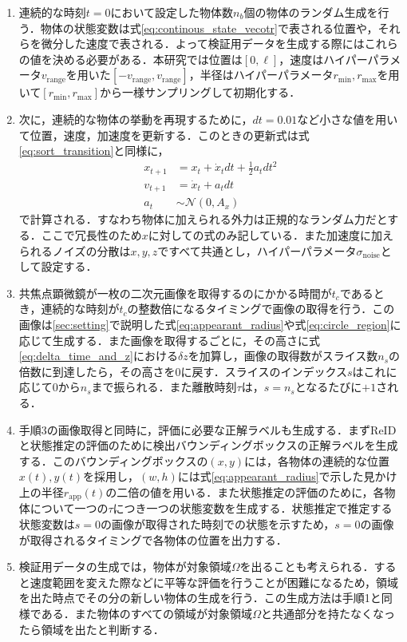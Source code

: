 \begin{enumerate}[label=手順\arabic*]
    \item 連続的な時刻$t=0$において設定した物体数$n_b$個の物体のランダム生成を行う．物体の状態変数は式\ref{eq:continous_state_vecotr}で表される位置や，それらを微分した速度で表される．よって検証用データを生成する際にはこれらの値を決める必要がある．本研究では位置は$[0, \ell]$，速度はハイパーパラメータ$v_{\text{range}}$を用いた$[-v_{\text{range}}, v_{\text{range}}]$，半径はハイパーパラメータ$r_{\text{min}}, r_{\text{max}}$を用いて$[r_{\text{min}}, r_{\text{max}}]$から一様サンプリングして初期化する．
    \item 次に，連続的な物体の挙動を再現するために，$dt=0.01$など小さな値を用いて位置，速度，加速度を更新する．このときの更新式は式\ref{eq:sort_transition}と同様に，
    \begin{equation}
        \label{eq:transition}
        \begin{aligned}
            x_{t+1} &= x_t + \dot{x}_t dt + \frac{1}{2} a_t dt^2
            \\v_{t+1} &= \dot{x}_t + a_t dt
            \\a_t &\sim \mathcal{N}(0, A_x)
        \end{aligned}
    \end{equation}
    で計算される．すなわち物体に加えられる外力は正規的なランダム力だとする．ここで冗長性のため$x$に対しての式のみ記している．また加速度に加えられるノイズの分散は$x, y, z$ですべて共通とし，ハイパーパラメータ$\sigma_{\text{noise}}$として設定する．
    \item 共焦点顕微鏡が一枚の二次元画像を取得するのにかかる時間が$t_c$であるとき，連続的な時刻が$t_c$の整数倍になるタイミングで画像の取得を行う．この画像は\ref{sec:setting}で説明した式\ref{eq:appearant_radius}や式\ref{eq:circle_region}に応じて生成する．また画像を取得するごとに，その高さに式\ref{eq:delta_time_and_z}における$\delta z$を加算し，画像の取得数がスライス数$n_s$の倍数に到達したら，その高さを$0$に戻す．スライスのインデックス$s$はこれに応じて$0$から$n_s$まで振られる．また離散時刻$\tau$は，$s=n_s$となるたびに$+1$される．
    \item 手順3の画像取得と同時に，評価に必要な正解ラベルも生成する．まずReIDと状態推定の評価のために検出バウンディングボックスの正解ラベルを生成する．このバウンディングボックスの$(x, y)$には，各物体の連続的な位置$x(t), y(t)$を採用し，$(w, h)$には式\ref{eq:appearant_radius}で示した見かけ上の半径$r_{\text{app}}(t)$の二倍の値を用いる．また状態推定の評価のために，各物体について一つの$\tau$につき一つの状態変数を生成する．状態推定で推定する状態変数は$s = 0$の画像が取得された時刻での状態を示すため，$s = 0$の画像が取得されるタイミングで各物体の位置を出力する．
    \item 検証用データの生成では，物体が対象領域$\Omega$を出ることも考えられる．すると速度範囲を変えた際などに平等な評価を行うことが困難になるため，領域を出た時点でその分の新しい物体の生成を行う．この生成方法は手順1と同様である．また物体のすべての領域が対象領域$\Omega$と共通部分を持たなくなったら領域を出たと判断する．
\end{enumerate}

